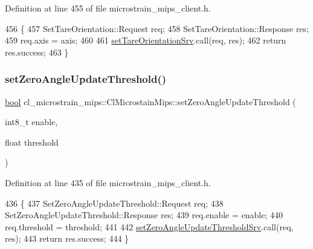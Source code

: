 Definition at line 455 of file microstrain\+\_\+mips\+\_\+client.\+h.


\begin{DoxyCode}
456     \{
457         SetTareOrientation::Request req;
458         SetTareOrientation::Response res;
459         req.axis = axis;
460 
461         \hyperlink{classcl__microstrain__mips_1_1ClMicrostainMips_affd28a64d0ee9bcdb116d974f5e19ec6}{setTareOrientationSrv}.call(req, res);
462         \textcolor{keywordflow}{return} res.success;
463     \}
\end{DoxyCode}
\mbox{\label{classcl__microstrain__mips_1_1ClMicrostainMips_a75ba5fe4116ece2f23f9f92f7ab96435}} 
\subsubsection{\texorpdfstring{set\+Zero\+Angle\+Update\+Threshold()}{setZeroAngleUpdateThreshold()}}
{\footnotesize\ttfamily \hyperlink{classbool}{bool} cl\+\_\+microstrain\+\_\+mips\+::\+Cl\+Microstain\+Mips\+::set\+Zero\+Angle\+Update\+Threshold (\begin{DoxyParamCaption}\item[{int8\+\_\+t}]{enable,  }\item[{float}]{threshold }\end{DoxyParamCaption})\hspace{0.3cm}{\ttfamily [inline]}}



Definition at line 435 of file microstrain\+\_\+mips\+\_\+client.\+h.


\begin{DoxyCode}
436     \{
437         SetZeroAngleUpdateThreshold::Request req;
438         SetZeroAngleUpdateThreshold::Response res;
439         req.enable = enable;
440         req.threshold = threshold;
441 
442         \hyperlink{classcl__microstrain__mips_1_1ClMicrostainMips_a88ffc1e573993764bb130c97cc64fe08}{setZeroAngleUpdateThresholdSrv}.call(req, res);
443         \textcolor{keywordflow}{return} res.success;
444     \}
\end{DoxyCode}


